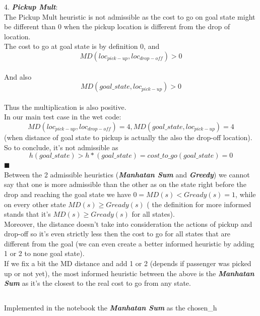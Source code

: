 \documentclass[12pt]{article}
\newcommand{\qed}{\hfill$\blacksquare$}
\begin{document}
4. {\textit{\textbf{Pickup Mult}}}:\\
The Pickup Mult heuristic is not admissible as the cost to go on goal state might be different than 0 when the pickup location is different from the drop of location.\\
The cost to go at goal state is by definition 0, and $$MD(loc_{pick-up},loc_{drop-off}) > 0$$\\
And also
$$MD(goal\_state,loc_{pick-up}) > 0$$\\
Thus the multiplication is also positive.\\
In our main test case in the wet code:
$$MD(loc_{pick-up},loc_{drop-off})=4, MD(goal\_state,loc_{pick-up})=4$$
(when distance of goal state to pickup is actually the also the drop-off location).
So to conclude, it's not admissible as $$h(goal\_state) > h*(goal\_state) = cost\_to\_go(goal\_state) = 0$$
\qed\\

Between the 2 admissible heuristics ({\textit{\textbf{Manhatan Sum}}} and  {\textit{\textbf{Greedy}}}) we cannot say that one is more admissible than the other as on the state right before the drop and reaching the goal state we have $0 = MD(s) < Gready(s) = 1$, while on every other state $MD(s) \geq Gready(s)$ ( the definition for more informed stands that it's $MD(s) \geq Gready(s)$ for all states).\\

Moreover, the distance doesn't take into consideration the actions of pickup and drop-off so it's even strictly less then the cost to go for all states that are different from the goal (we can even create a better informed heuristic by adding 1 or 2 to none goal state).\\

If we fix a bit the MD distance and add 1 or 2 (depends if passenger was picked up or not yet), the most informed heuristic between the above is the {\textit{\textbf{Manhatan Sum}}} as it's the closest to the real cost to go from any state.


\subsection{}

Implemented in the notebook the {\textit{\textbf{Manhatan Sum}}} as the chosen\_h

\subsection{}
\end{document}
